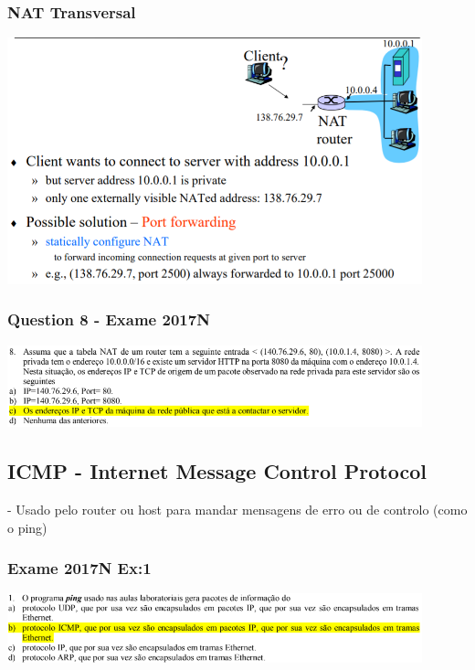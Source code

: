 \documentclass[../resumosRCOM.tex]{subfiles}
\begin{document}
\subsubsection{NAT Transversal}
\begin{center}
    \includegraphics[width=12cm]{images/RCOM29.png}
\end{center}

\subsubsection{Question 8 - Exame 2017N}
\begin{center}
    \includegraphics[width=12cm]{images/RCOM47.png}
\end{center}

\subsection{ICMP - Internet Message Control Protocol}

- Usado pelo router ou host para mandar mensagens de erro ou de controlo (como o ping)

\subsubsection{Exame 2017N Ex:1}
\begin{center}
    \includegraphics[width=12cm]{images/RCOM46.png}
\end{center}
\end{document}
